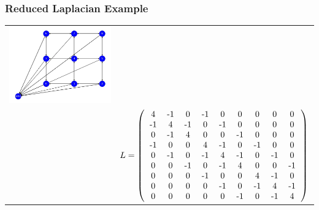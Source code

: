\documentclass{beamer}
\begin{document}
\begin{frame}
\frametitle{Reduced Laplacian Example}

\begin{tabular}{cc}
\includegraphics[scale=0.15]{sandpile_base}
&

 \\
 &   $L = \left(
  \begin{tabular}{ccccccccc}
  4&-1&0&-1&0&0&0&0&0\\
  -1&4&-1&0&-1&0&0&0&0\\
  0&-1&4&0&0&-1&0&0&0\\
  -1&0&0&4&-1&0&-1&0&0\\
  0&-1&0&-1&4&-1&0&-1&0\\
  0&0&-1&0&-1&4&0&0&-1\\
  0&0&0&-1&0&0&4&-1&0\\
  0&0&0&0&-1&0&-1&4&-1\\
  0&0&0&0&0&-1&0&-1&4
  \end{tabular}
  \right)$

\end{tabular}
\end{frame}
\end{document}
